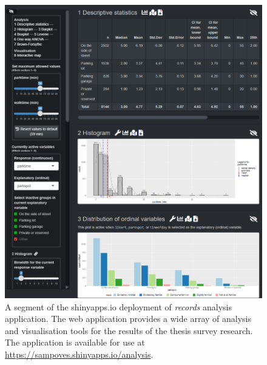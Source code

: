 \begin{figure}[H]%
    \centering
    \includegraphics[width=\textwidth]{images/shinyapps_analysis.png}
    \caption[Records analysis application screen capture]{A segment of the shinyapps.io deployment of \textit{records} analysis application. The web application provides a wide array of analysis and visualisation tools for the results of the thesis survey research. The application is available for use at \textcolor{blue}{\url{https://sampoves.shinyapps.io/analysis}}.}%
    \label{fig:shinyapps_analysis}%
\end{figure}


